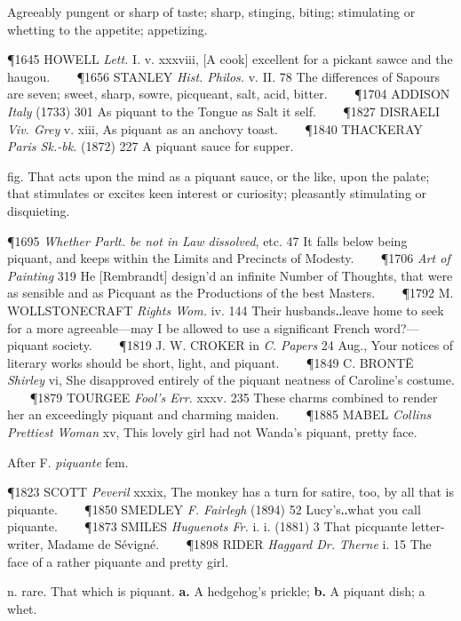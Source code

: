 \begin{description}[wide, labelwidth=!, labelindent=0pt]
\begin{myenumerate}
 Agreeably pungent or sharp of taste; sharp, stinging, biting; stimulating or whetting to the appetite; appetizing.

\P 1645 HOWELL  \textit{Lett.} I. v. xxxviii, [A cook] excellent for a pickant sawce and the haugou.    
\P 1656 STANLEY  \textit{Hist. Philos.} v. II. 78 The differences of Sapours are seven; sweet, sharp, sowre, picqueant, salt, acid, bitter.    
\P 1704 ADDISON  \textit{Italy} (1733) 301 As piquant to the Tongue as Salt it self.    
\P 1827 DISRAELI  \textit{Viv. Grey} v. xiii, As piquant as an anchovy toast.    
\P 1840 THACKERAY  \textit{Paris Sk.-bk.} (1872) 227 A piquant sauce for supper.

 fig. That acts upon the mind as a piquant sauce, or the like, upon the palate; that stimulates or excites keen interest or curiosity; pleasantly stimulating or disquieting.

\P 1695 \textit{Whether  Parlt. be not in Law dissolved}, etc. 47 It falls below being piquant, and keeps within the Limits and Precincts of Modesty.    
\P 1706 \textit{Art  of Painting} 319 He [Rembrandt] design'd an infinite Number of Thoughts, that were as sensible and as Picquant as the Productions of the best Masters.    
\P 1792 M. WOLLSTONECRAFT  \textit{Rights Wom.} iv. 144 Their husbands‥leave home to seek for a more agreeable—may I be allowed to use a significant French word?—piquant society.    
\P 1819 J. W. CROKER in \textit{C. Papers} 24 Aug., Your notices of literary works should be short, light, and piquant.    
\P 1849 C. BRONTË  \textit{Shirley} vi, She disapproved entirely of the piquant neatness of Caroline's costume.    
\P 1879 TOURGEE  \textit{Fool's Err.} xxxv. 235 These charms combined to render her an exceedingly piquant and charming maiden.    
\P 1885 MABEL  \textit{Collins Prettiest Woman} xv, This lovely girl had not Wanda's piquant, pretty face.

 After F. \textit{piquante} fem.

\P 1823 SCOTT  \textit{Peveril} xxxix, The monkey has a turn for satire, too, by all that is piquante.    
\P 1850 SMEDLEY  \textit{F. Fairlegh} (1894) 52 Lucy's‥what you call piquante.    
\P 1873 SMILES  \textit{Huguenots Fr.} i. i. (1881) 3 That picquante letter-writer, Madame de Sévigné.    
\P 1898 RIDER  \textit{Haggard Dr. Therne} i. 15 The face of a rather piquante and pretty girl.

 n. rare. That which is piquant. \textbf{a.} A hedgehog's prickle; \textbf{b.} A piquant dish; a whet.


\end{myenumerate}
\end{description}
